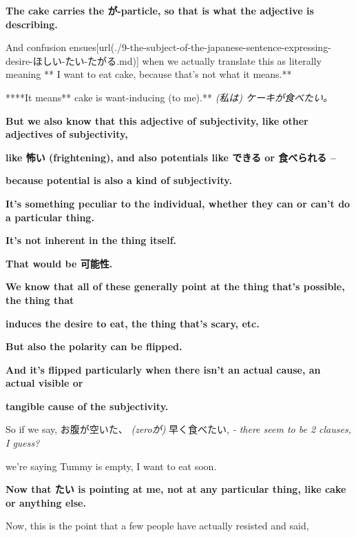 {\bf The cake carries the が-particle, so that is what the adjective is describing.}

\thinrule

And confusion ensues\goto{{[}9{]}}[url(./9-the-subject-of-the-japanese-sentence-expressing-desire-ほしい-たい-たがる.md)] when we actually translate this as literally meaning **\crlf
I want to eat cake, because that's not what it means.**

****It means** cake is want-inducing (to me).** {\em (私は) ケーキが食べたい。}

\thinrule

{\bf But we also know that this adjective of subjectivity, like other adjectives of subjectivity,}

{\bf like 怖い (frightening), and also potentials like できる or 食べられる --}

{\bf because potential is also a kind of subjectivity.}

\thinrule

{\bf It's something peculiar to the individual, whether they can or can't do a particular thing.}

{\bf It's not inherent in the thing itself.}

{\bf That would be 可能性.}

\thinrule

{\bf We know that all of these generally point at the thing that's possible, the thing that}

{\bf induces the desire to eat, the thing that's scary, etc.}

{\bf But also the polarity can be flipped.}

{\bf And it's flipped particularly when there isn't an actual cause, an actual visible or}

{\bf tangible cause of the subjectivity.}

\stopsectionlevel

\startsectionlevel[title={The polarity flipping},reference={the-polarity-flipping}]

So if we say, お腹が空いた、 {\em (zeroが)} 早く食べたい, {\em - there seem to be 2 clauses, I guess?}

we're saying Tummy is empty, I want to eat soon.

{}

{\bf Now that たい is pointing at me, not at any particular thing, like cake or anything else.}

Now, this is the point that a few people have actually resisted and said,\crlf
{}

